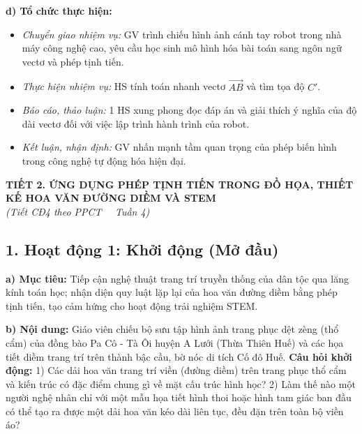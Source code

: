\documentclass[12pt, a4paper]{article}
\renewcommand{\vec}[1]{\overrightarrow{#1}}
\begin{document}
\noindent \textbf{d) Tổ chức thực hiện:}  
\begin{itemize}[leftmargin=0.8cm]  
    \item \textit{Chuyển giao nhiệm vụ:} GV trình chiếu hình ảnh cánh tay robot trong nhà máy công nghệ cao, yêu cầu học sinh mô hình hóa bài toán sang ngôn ngữ vectơ và phép tịnh tiến.  
    \item \textit{Thực hiện nhiệm vụ:} HS tính toán nhanh vectơ $\vec{AB}$ và tìm tọa độ $C'$.  
    \item \textit{Báo cáo, thảo luận:} 1 HS xung phong đọc đáp án và giải thích ý nghĩa của độ dài vectơ đối với việc lập trình hành trình của robot.  
    \item \textit{Kết luận, nhận định:} GV nhấn mạnh tầm quan trọng của phép biến hình trong công nghệ tự động hóa hiện đại.  
\end{itemize}  
  
\vspace{10pt}  
\begin{center}  
    {\fontsize{13pt}{16pt}\selectfont \textbf{TIẾT 2. ỨNG DỤNG PHÉP TỊNH TIẾN TRONG ĐỒ HỌA, THIẾT KẾ HOA VĂN ĐƯỜNG DIỀM VÀ STEM}}\\[2pt]  
    \textit{(Tiết CĐ4 theo PPCT \ \textbar \ Tuần 4)}  
\end{center}  
  
\subsection*{1. Hoạt động 1: Khởi động (Mở đầu)}  
  
\noindent \textbf{a) Mục tiêu:}  
Tiếp cận nghệ thuật trang trí truyền thống của dân tộc qua lăng kính toán học; nhận diện quy luật lặp lại của hoa văn đường diềm bằng phép tịnh tiến, tạo cảm hứng cho hoạt động trải nghiệm STEM.  
  
\noindent \textbf{b) Nội dung:}  
Giáo viên chiếu bộ sưu tập hình ảnh trang phục dệt zèng (thổ cẩm) của đồng bào Pa Cô - Tà Ôi huyện A Lưới (Thừa Thiên Huế) và các họa tiết diềm trang trí trên thành bậc cầu, bờ nóc di tích Cố đô Huế.  
\textbf{Câu hỏi khởi động:}  
1) Các dải hoa văn trang trí viền (đường diềm) trên trang phục thổ cẩm và kiến trúc có đặc điểm chung gì về mặt cấu trúc hình học?  
2) Làm thế nào một người nghệ nhân chỉ với một mẫu họa tiết hình thoi hoặc hình tam giác ban đầu có thể tạo ra được một dải hoa văn kéo dài liên tục, đều đặn trên toàn bộ viền áo?  
  
\end{document}
